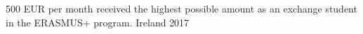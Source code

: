 



\begin{cvhonors}

  \cvhonor
    {500 EUR per month} %
    {received the highest possible amount as an exchange student in the ERASMUS+ program.} %
    {Ireland} %
    {2017} %


\end{cvhonors}







